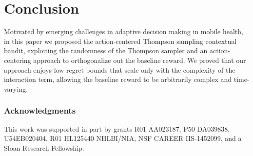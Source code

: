 \documentclass{article}
\begin{document}







\section{Conclusion}
Motivated by emerging challenges in adaptive decision making in mobile health, in this paper we proposed the action-centered Thompson sampling contextual bandit, exploiting the randomness of the Thompson sampler and an action-centering approach to orthogonalize out the baseline reward. We proved that our approach enjoys low regret bounds that scale only with the complexity of the interaction term, allowing the baseline reward to be arbitrarily complex and time-varying. 




\subsubsection*{Acknowledgments}
This work was supported in part by grants R01 AA023187, P50 DA039838, U54EB020404, R01 HL125440 NHLBI/NIA, NSF CAREER IIS-1452099, and a Sloan Research Fellowship.
\end{document}
